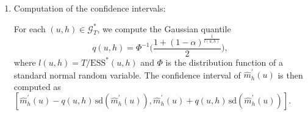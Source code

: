 \begin{enumerate}[leftmargin=0.75cm,label=(\alph*)]
\newpage
\item Computation of the confidence intervals:  

For each $(u,h) \in \mathcal{G}_T^*$, we compute the Gaussian quantile 
\[ q(u,h) = \Phi^{-1} \Big(\frac{1 + (1 - \alpha)^{\frac{1}{l(u, h)}}}{2}\Big), \]
where $l(u,h) = T/\text{ESS}^*(u, h)$ and $\Phi$ is the distribution function of a standard normal random variable. The confidence interval of $\widehat{m}^\prime_h(u)$ is then computed as $[\widehat{m}^\prime_h(u) - q(u,h) \, \text{sd}(\widehat{m}^\prime_h(u)),\widehat{m}^\prime_h(u) + q(u,h) \, \text{sd}(\widehat{m}^\prime_h(u))]$. 

\end{enumerate}
